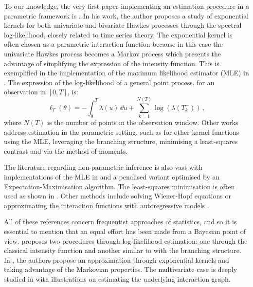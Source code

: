 
    To our knowledge, the very first paper implementing an estimation procedure in a parametric framework is \textcite{Adamopoulos1976}.
    In his work, the author proposes a study of exponential kernels for both univariate and bivariate Hawkes processes through the spectral log-likelihood,
    closely related to time series theory.
    The exponential kernel is often chosen as a parametric interaction function because in this case the univariate Hawkes process becomes a Markov process which presents the advantage of simplifying the expression of the intensity function. 
    This is exemplified in the implementation of the maximum likelihood estimator (MLE) in \textcite{Ozaki1979}.
    The expression of the log-likelihood of a general point process, for an observation in $[0, T]$, is:
    \begin{equation}\label{eq:chap0_loglikelihood}
      \ell_T(\theta) = - \int_{0}^{T}{\lambda(u)\,\dd u} + \sum_{k=1}^{N(T)}{\log(\lambda(T_k^-))}\,,
    \end{equation}
    where $N(T)$ is the number of points in the observation window. 
    Other works address estimation in the parametric setting, such as \textcite{Ogata1988} for other kernel functions using the MLE, \textcite{Veen2008} leveraging the branching structure, \textcite{Bacry2020} minimising a least-squares contrast and \textcite{DaFonseca2013} via the method of moments.

    The literature regarding non-parametric inference is also vast with implementations of the MLE in \textcite{Guo2018} and a penalised variant optimised by an Expectation-Maximisation algorithm.
    The least-squares minimisation is often used as shown in \textcite{Reynaud2010, Eichler2016, Kirchner2017}.
    Other methods include solving Wiener-Hopf equations \parencite{Bacry2016} or approximating the interaction functions with autoregressive models \parencite{Kirchner2017}.

    All of these references concern frequentist approaches of statistics, 
    and so it is essential to mention that an equal effort has been made from a Bayesian point of view.
    \textcite{Rasmussen2013} proposes two procedures through log-likelihood estimation: 
    one through the classical intensity function and another similar to \textcite{Veen2008} with the branching structure.
    In \textcite{Lemonnier2014}, the authors propose an approximation through exponential kernels and taking advantage of the Markovian properties.
    The multivariate case is deeply studied in \textcite{Donnet2020} with illustrations on estimating the underlying interaction graph.
    
